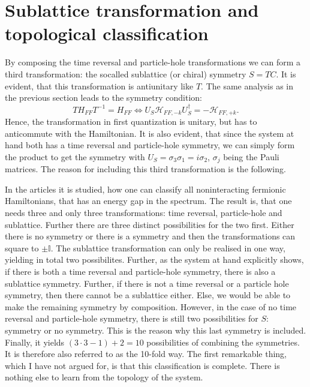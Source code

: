\section{Sublattice transformation and topological classification}
By composing the time reversal and particle-hole transformations we can form a third transformation: the socalled sublattice (or chiral) symmetry $S = TC$. It is evident, that this transformation is antiunitary like $T$. The same analysis as in the previous section leads to the symmetry condition:
\begin{equation}
TH_{FF}T^{-1} = H_{FF} \Leftrightarrow U_S\mathcal{H}_{FF,-k} U^\dagger_S = - \mathcal{H}_{FF,+k}.
\end{equation}
Hence, the transformation in first quantization is unitary, but has to anticommute with the Hamiltonian. It is also evident, that since the system at hand both has a time reversal and particle-hole symmetry, we can simply form the product to get the symmetry with $U_S = \sigma_3\sigma_1 = i\sigma_2$, $\sigma_j$ being the Pauli matrices. The reason for including this third transformation is the following. 

In the articles \cite{Ludwig.Topology, Chiu.Topology} it is studied, how one can classify all noninteracting fermionic Hamiltonians, that has an energy gap in the spectrum. The result is, that one needs three and only three transformations: time reversal, particle-hole and sublattice. Further there are three distinct possibilities for the two first. Either there is no symmetry or there is a symmetry and then the transformations can square to $\pm \mathbb{I}$. The sublattice transformation can only be realised in one way, yielding in total two possibilites. Further, as the system at hand explicitly shows, if there is both a time reversal and particle-hole symmetry, there is also a sublattice symmetry. Further, if there is not a time reversal or a particle hole symmetry, then there cannot be a sublattice either. Else, we would be able to make the remaining symmetry by composition. However, in the case of no time reversal and particle-hole symmetry, there is still two possibilities for $S$: symmetry or no symmetry. This is the reason why this last symmetry is included. Finally, it yields $(3\cdot 3 - 1) + 2 = 10$ possibilities of combining the symmetries. It is therefore also referred to as the 10-fold way. The first remarkable thing, which I have not argued for, is that this classification is complete. There is nothing else to learn from the topology of the system. 

